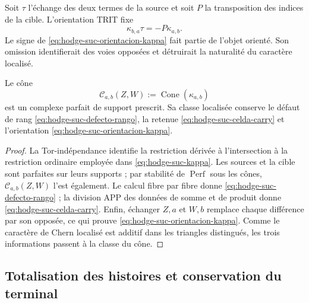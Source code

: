 Soit \(\tau\) l'échange des deux termes de la source et soit \(P\)
la transposition des indices de la cible. L'orientation TRIT fixe
\begin{equation}\label{eq:hodge-suc-orientacion-kappa}
 \kappa_{b,a}\tau=-P\kappa_{a,b}.
\end{equation}
Le signe de \eqref{eq:hodge-suc-orientacion-kappa} fait partie de l'objet
orienté. Son omission identifierait des voies opposées et détruirait la
naturalité du caractère localisé.

\begin{proposition}
\label{prop:hodge-suc-celda-perf}
Le cône
\begin{equation}\label{eq:hodge-suc-cone-kappa}
 \mathcal C_{a,b}(Z,W):=\operatorname{Cone}(\kappa_{a,b})
\end{equation}
est un complexe parfait de support prescrit. Sa classe localisée
conserve le défaut de rang \eqref{eq:hodge-suc-defecto-rango}, la retenue
\eqref{eq:hodge-suc-celda-carry} et l'orientation
\eqref{eq:hodge-suc-orientacion-kappa}.
\end{proposition}

\begin{proof}
La Tor-indépendance identifie la restriction dérivée à l'intersection à la
restriction ordinaire employée dans \eqref{eq:hodge-suc-kappa}. Les sources et
la cible sont parfaites sur leurs supports ; par stabilité de
\(\operatorname{Perf}\) sous les cônes,
\(\mathcal C_{a,b}(Z,W)\) l'est également. Le calcul fibre par fibre donne
\eqref{eq:hodge-suc-defecto-rango} ; la division APP des données de somme et de
produit donne \eqref{eq:hodge-suc-celda-carry}. Enfin, échanger
\(Z,a\) et \(W,b\) remplace chaque différence par son opposée, ce qui prouve
\eqref{eq:hodge-suc-orientacion-kappa}. Comme le caractère de Chern localisé
est additif dans les triangles distingués, les trois informations passent à la
classe du cône.
\end{proof}

\subsection*{Totalisation des histoires et conservation du terminal}

